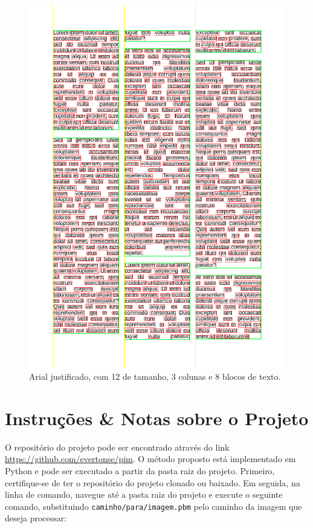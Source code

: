 \documentclass[english, 
               brazil, 
               bsc] %
               {dcomp-abntex2}
\begin{document}
\begin{figure}[H]
        \caption{\label{arial} \small Arial justificado, com 12 de tamanho, 3 colunas e 8 blocos de texto.}
        \begin{center}
            \includegraphics[scale=0.25]{./images/arial_justificado_tamanho_12_colunas_3_blocos_8_linhas_52_palavras_557.png}
        \end{center}
\end{figure}


\chapter{Instruções \& Notas sobre o Projeto}
\label{ch-notas}

O repositório do projeto pode ser encontrado através do link \url{https://github.com/evertonse/pim}. O método proposto está implementado em Python e pode ser executado a partir da pasta raiz do projeto. Primeiro, certifique-se de ter o repositório do projeto clonado ou baixado. Em seguida, na linha de comando, navegue até a pasta raiz do projeto e execute o seguinte comando, substituindo \texttt{caminho/para/imagem.pbm} pelo caminho da imagem que deseja processar:
\end{document}
